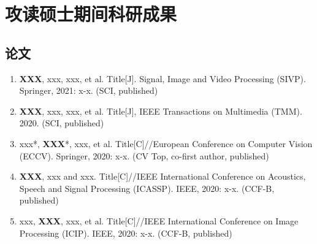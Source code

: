 \documentclass[]{WHUMaster-chapter-center} %
\begin{document}

%

%




%






\cleardoublepage{}
{}


\chapter*{攻读硕士期间科研成果}

\section*{论文}
\begin{enumerate}[parsep=1.ex]
\renewcommand\labelenumi{[\theenumi]}  %
\item 
\textbf{XXX}, xxx, xxx, et al. Title[J]. Signal, Image and Video Processing (SIVP). Springer, 2021: x-x. (SCI, published)

\item 
\textbf{XXX}, xxx, xxx, et al. Title[J], IEEE Transactions on Multimedia (TMM). 2020. (SCI, published)

\item 
xxx*, \textbf{XXX}*, xxx, et al. Title[C]//European Conference on Computer Vision (ECCV). Springer, 2020: x-x. (CV Top, co-first author, published)

\item 
\textbf{XXX}, xxx and xxx. Title[C]//IEEE International Conference on Acoustics, Speech and Signal Processing (ICASSP). IEEE, 2020: x-x. (CCF-B, published)

\item 
xxx, \textbf{XXX}, xxx, et al. Title[C]//IEEE International Conference on Image Processing (ICIP). IEEE, 2020: x-x. (CCF-B, published)

\end{enumerate}
\end{document}
